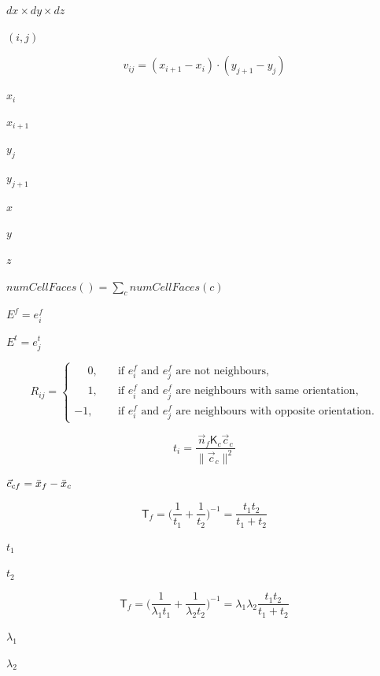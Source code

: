\documentclass{article}
\begin{document}
$\mathit{dx}\times \mathit{dy}\times
\mathit{dz}$
\pagebreak

$(i,j)$
\pagebreak

\[
v_{ij} = (x_{i+1} - x_i)\cdot (y_{j+1} - y_j)
\]
\pagebreak

$x_i$
\pagebreak

$x_{i+1}$
\pagebreak

$y_j$
\pagebreak

$y_{j+1}$
\pagebreak

$x$
\pagebreak

$y$
\pagebreak

$z$
\pagebreak

$ numCellFaces()=\sum_{c} numCellFaces(c) $
\pagebreak

$E^f = { e^f_i } $
\pagebreak

$E^t = { e^t_j }$
\pagebreak

\begin{equation*}
R_{ij} =
\begin{cases}
\phantom{-} 0, &\quad \text{if } e_i^f \text{ and } e_j^f \text{ are not neighbours}, \\
\phantom{-} 1, &\quad \text{if } e_i^f \text{ and } e_j^f \text{ are neighbours with same orientation}, \\
-  1, &\quad \text{if } e_i^f \text{ and } e_j^f \text{ are neighbours with opposite orientation}.
\end{cases}
\end{equation*}
\pagebreak

\[
t_i = \frac{\vec{n}_f \mathsf{K}_c \vec{c}_c}{\lVert \vec{c}_c \rVert^2}
\]
\pagebreak

$\vec{c}_{cf} = \Bar{x}_f - \Bar{x}_c$
\pagebreak

\[
\mathsf{T}_f = \big(\frac{1}{t_1} + \frac{1}{t_2}\big)^{-1}
             = \frac{t_1t_2}{t_1 + t_2}
\]
\pagebreak

$t_1$
\pagebreak

$t_2$
\pagebreak

\[
\mathsf{T}_f = \big(\frac{1}{\lambda_1t_1} + \frac{1}{\lambda_2t_2}\big)^{-1}
             = \lambda_1\lambda_2 \frac{t_1t_2}{t_1 + t_2}
\]
\pagebreak

$\lambda_1$
\pagebreak

$\lambda_2$
\pagebreak
\end{document}
